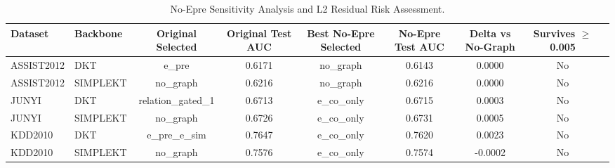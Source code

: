 \begin{table}[h]
\centering
\caption{No-Epre Sensitivity Analysis and L2 Residual Risk Assessment.}
\label{tab:no_epre_L2_sensitivity}
\begin{tabular}{llccccccl}
\toprule
Dataset & Backbone & Original Selected & Original Test AUC & Best No-Epre Selected & No-Epre Test AUC & Delta vs No-Graph & Survives $\ge$ 0.005 \\
\midrule
ASSIST2012 & DKT & e_pre & 0.6171 & no_graph & 0.6143 & 0.0000 & No \\
ASSIST2012 & SIMPLEKT & no_graph & 0.6216 & no_graph & 0.6216 & 0.0000 & No \\
JUNYI & DKT & relation_gated_1 & 0.6713 & e_co_only & 0.6715 & 0.0003 & No \\
JUNYI & SIMPLEKT & no_graph & 0.6726 & e_co_only & 0.6731 & 0.0005 & No \\
KDD2010 & DKT & e_pre_e_sim & 0.7647 & e_co_only & 0.7620 & 0.0023 & No \\
KDD2010 & SIMPLEKT & no_graph & 0.7576 & e_co_only & 0.7574 & -0.0002 & No \\
\bottomrule
\end{tabular}
\end{table}
